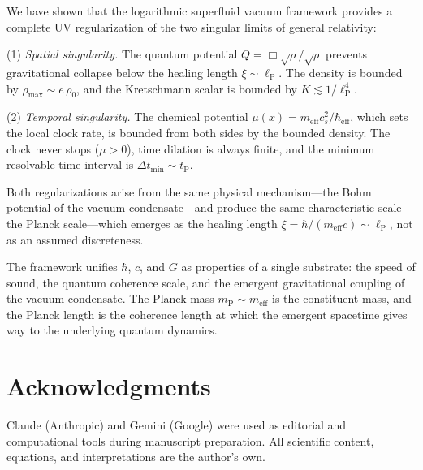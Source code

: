 \documentclass[12pt, a4paper]{article}
\newcommand{\meff}{m_{\mathrm{eff}}}
\newcommand{\heff}{\hbar_{\mathrm{eff}}}
\newcommand{\lP}{\ell_{\mathrm{P}}}
\newcommand{\mP}{m_{\mathrm{P}}}
\newcommand{\tP}{t_{\mathrm{P}}}
\begin{document}
We have shown that the logarithmic superfluid vacuum framework provides a complete UV regularization of the two singular limits of general relativity:

(1) \emph{Spatial singularity.} The quantum potential $Q = \Box\sqrt{\rho}/\sqrt{\rho}$ prevents gravitational collapse below the healing length $\xi \sim \lP$. The density is bounded by $\rho_{\max} \sim e\,\rho_0$, and the Kretschmann scalar is bounded by $K \lesssim 1/\lP^4$.

(2) \emph{Temporal singularity.} The chemical potential $\mu(x) = \meff c_s^2/\heff$, which sets the local clock rate, is bounded from both sides by the bounded density. The clock never stops ($\mu > 0$), time dilation is always finite, and the minimum resolvable time interval is $\Delta t_{\min} \sim \tP$.

Both regularizations arise from the same physical mechanism---the Bohm potential of the vacuum condensate---and produce the same characteristic scale---the Planck scale---which emerges as the healing length $\xi = \hbar/(\meff c) \sim \lP$, not as an assumed discreteness.

The framework unifies $\hbar$, $c$, and $G$ as properties of a single substrate: the speed of sound, the quantum coherence scale, and the emergent gravitational coupling of the vacuum condensate. The Planck mass $\mP \sim \meff$ is the constituent mass, and the Planck length is the coherence length at which the emergent spacetime gives way to the underlying quantum dynamics.


\section*{Acknowledgments}

Claude (Anthropic) and Gemini (Google) were used as editorial and computational tools during manuscript preparation. All scientific content, equations, and interpretations are the author's own.
\end{document}
